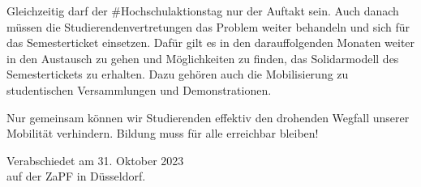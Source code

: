 \documentclass[DIV=calc]{scrartcl}
\begin{document}
Gleichzeitig darf der \#Hochschulaktionstag nur der Auftakt sein. Auch danach müssen die Studierendenvertretungen das Problem weiter behandeln und sich für das Semesterticket einsetzen. Dafür gilt es in den darauffolgenden Monaten weiter in den Austausch zu gehen und Möglichkeiten zu finden, das Solidarmodell des Semestertickets zu erhalten. Dazu gehören auch die Mobilisierung zu studentischen Versammlungen und Demonstrationen.

Nur gemeinsam können wir Studierenden effektiv den drohenden Wegfall unserer Mobilität verhindern. Bildung muss für alle erreichbar bleiben!


%
\vfill
\begin{flushright}
	Verabschiedet am 31. Oktober 2023 \\
	auf der ZaPF in Düsseldorf.
\end{flushright}
\end{document}
